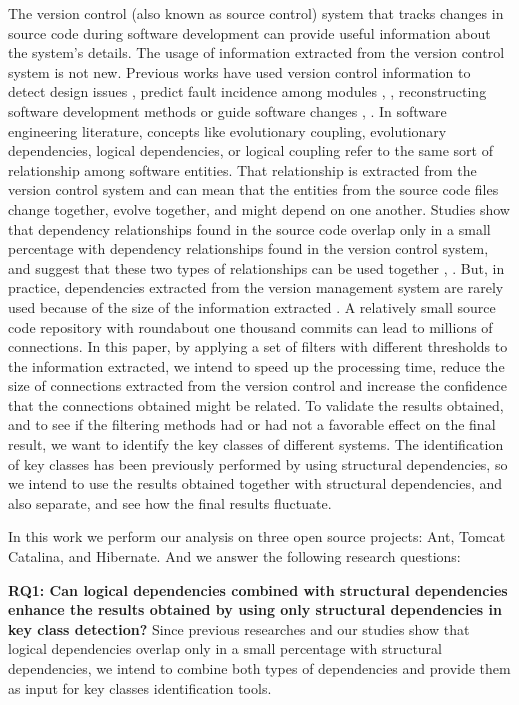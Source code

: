 \documentclass[runningheads]{comsis2}
\begin{document}
The version control (also known as source control) system that tracks changes in source code during software development can provide useful information about the system's details. 
The usage of information extracted from the version control system is not new. Previous works have used version control information to detect design issues \cite{Zimmermann:2004:MVH:998675.999460}, predict fault incidence among modules \cite{Predictingfaultincidence}, \cite{Cataldo2009SoftwareDW}, reconstructing software development methods \cite{article_comsis} or guide software changes \cite{4815274}, \cite{DBLP:journals/ese/AjienkaCC18}.
In software engineering literature, concepts like evolutionary coupling, evolutionary dependencies, logical dependencies, or logical coupling refer to the same sort of relationship among software entities. That relationship is extracted from the version control system and can mean that the entities from the source code files change together, evolve together, and might depend on one another. Studies show that dependency relationships found in the source code overlap only in a small percentage with dependency relationships found in the version control system, and suggest that these two types of relationships can be used together \cite{Oliva:2011:ISL:2067853.2068086}, \cite{DBLP:journals/jss/AjienkaC17}. But, in practice, dependencies extracted from the version management system are rarely used because of the size of the information extracted \cite{Shtern:2012:CMS:2332427.2332428}. A relatively small source code repository with roundabout one thousand commits can lead to millions of connections. 
In this paper, by applying a set of filters with different thresholds to the information extracted, we intend to speed up the processing time, reduce the size of connections extracted from the version control and increase the confidence that the connections obtained might be related.
To validate the results obtained, and to see if the filtering methods had or had not a favorable effect on the final result, we want to identify the key classes of different systems. The identification of key classes has been previously performed by using structural dependencies, so
we intend to use the results obtained together with structural dependencies, and also separate, and see how the final results fluctuate.

In this work we perform our analysis on three open
source projects: Ant, Tomcat Catalina, and Hibernate. And we answer the following research questions:

\textbf{RQ1: Can logical dependencies combined with structural dependencies enhance the results obtained by using only structural dependencies in key class detection?}
Since previous researches and our studies show that logical dependencies overlap only in a small percentage with structural dependencies, we intend to combine both types of dependencies and provide them as input for key classes identification tools.
\end{document}
